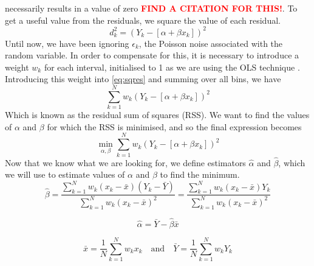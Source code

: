 \documentclass[a4paper,11pt]{article}
\begin{document}
necessarily results in a value of zero \textcolor{red}{\textbf{FIND A CITATION FOR THIS!}}. To
get a useful value from the residuals, we square the value of each residual.
\begin{equation}\label{eq:sqres}
d_k^2=(Y_k-[\alpha +\beta x_k])^2
\end{equation}
Until now, we have been ignoring ${\epsilon}_k$, the Poisson noise associated
with the random variable. In order to compensate for this, it is necessary to
introduce a weight $w_k$ for each interval, initialised to 1 as we are using
the OLS technique \cite{massey1996estimating}. Introducing this weight into
\eqref{eq:sqres} and summing over all bins, we have
\begin{equation}
\sum_{k=1}^N w_k(Y_k-[\alpha +\beta x_k])^2
\end{equation}
Which is known as the residual sum of squares (RSS). We want to find the values of
$\alpha$ and $\beta$ for which the RSS is minimised, and so the final expression becomes
\begin{equation}
\min_{\alpha,\beta}\sum_{k=1}^N w_k(Y_k-[\alpha +\beta x_k])^2
\end{equation}
Now that we know what we are looking for, we define estimators $\hat{\alpha}$
and $\hat{\beta}$, which we will use to estimate values of $\alpha$ and $\beta$
to find the minimum.
\begin{equation}
\hat{\beta}=\frac{\sum_{k=1}^N
w_k(x_k-\bar{x})(Y_k-\bar{Y})}{\displaystyle \sum_{k=1}^N w_k(x_k-\bar{x})^2}=\frac{\displaystyle\sum_{k=1}^N w_k(x_k-\bar{x})Y_k}{\sum_{k=1}^N w_k(x_k-\bar{x})^2}
\end{equation}

\begin{equation}
\hat{\alpha}=\bar{Y}-\hat{\beta}\bar{x}
\end{equation}

\begin{equation}
\bar{x}=\frac{1}{N}\sum_{k=1}^N w_kx_k\quad \text{and}\quad
\bar{Y}=\frac{1}{N}\sum_{k=1}^N w_kY_k
\end{equation}
\end{document}
